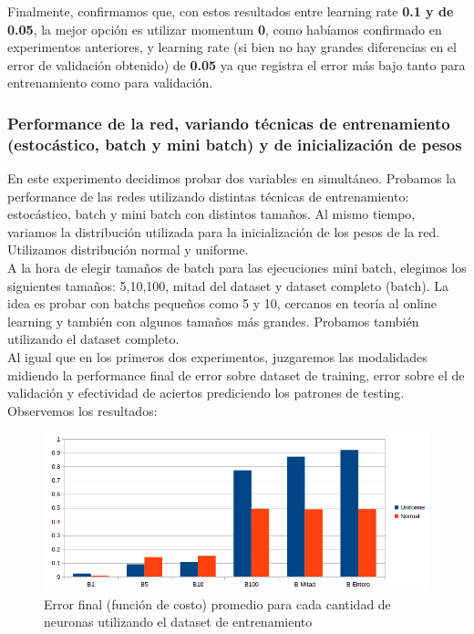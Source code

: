 Finalmente, confirmamos que, con estos resultados entre learning rate \textbf{0.1 y de 0.05}, la mejor opción es utilizar momentum \textbf{0}, como habíamos 
confirmado en experimentos anteriores, y learning rate (si bien no hay grandes diferencias en el error de validación obtenido) de \textbf{0.05} ya que 
registra el error más bajo tanto para entrenamiento como para validación.

\subsubsection{Performance de la red, variando técnicas de entrenamiento (estocástico, batch y mini batch) y de inicialización de pesos}

En este experimento decidimos probar dos variables en simultáneo. Probamos la performance de las redes utilizando
distintas técnicas de entrenamiento: estocástico, batch y mini batch con distintos tamaños. Al mismo tiempo, variamos 
la distribución utilizada para la inicialización de los pesos de la red. Utilizamos distribución normal y uniforme.\\

A la hora de elegir tamaños de batch para las ejecuciones mini batch, elegimos los siguientes tamaños: 5,10,100, mitad del dataset y dataset completo (batch). La idea es probar con batchs pequeños como 5 y 10, cercanos en teoría al online learning y también con algunos tamaños más grandes. Probamos también utilizando el dataset completo.\\

Al igual que en los primeros dos experimentos, juzgaremos las modalidades midiendo la performance final de error sobre dataset de training, error sobre el de validación y efectividad de aciertos prediciendo los patrones de testing.\\
Observemos los resultados:

\begin{figure}[h]
  \begin{center}
  \includegraphics[scale=0.75]{graficos/distribucion_error_final.png}
  \caption{Error final (función de costo) promedio para cada cantidad de neuronas utilizando el dataset de entrenamiento}
  \end{center}
\end{figure}

